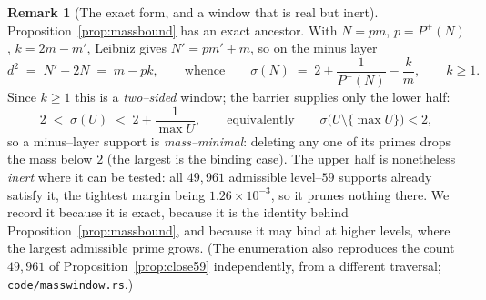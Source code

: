 \documentclass[11pt]{article}
\theoremstyle{definition}
\newtheorem{remark}[theorem]{Remark}
\begin{document}
\begin{remark}[The exact form, and a window that is real but inert]\label{rem:masswindow}
Proposition~\ref{prop:massbound} has an exact ancestor. With $N=pm$, $p=P^+(N)$, $k=2m-m'$, Leibniz
gives $N'=pm'+m$, so on the minus layer
\[ d^2\;=\;N'-2N\;=\;m-pk,\qquad\text{whence}\qquad
   \sigma(N)\;=\;2+\frac1{P^+(N)}-\frac km,\qquad k\ge1. \]
Since $k\ge1$ this is a \emph{two--sided} window; the barrier supplies only the lower half:
\[ 2\;<\;\sigma(U)\;<\;2+\frac1{\max U},\qquad\text{equivalently}\qquad \sigma\bigl(U\setminus\{\max U\}\bigr)<2, \]
so a minus--layer support is \emph{mass--minimal}: deleting any one of its primes drops the mass below
$2$ (the largest is the binding case). The upper half is nonetheless \emph{inert} where it can be
tested: all $49{,}961$ admissible level--$59$ supports already satisfy it, the tightest margin being
$1.26\times10^{-3}$, so it prunes nothing there. We record it because it is exact, because it is the
identity behind Proposition~\ref{prop:massbound}, and because it may bind at higher levels, where the
largest admissible prime grows. (The enumeration also reproduces the count $49{,}961$ of
Proposition~\ref{prop:close59} independently, from a different traversal;
\texttt{code/masswindow.rs}.)
\end{remark}
\end{document}

